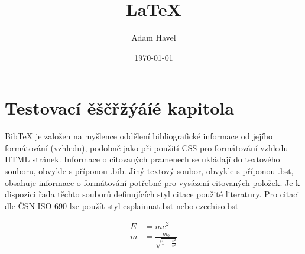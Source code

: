 \documentclass[12pt]{article}
\title{\LaTeX}
\date{\today}
\author{Adam Havel}
\begin{document}
\maketitle
\section{Testovací ěščřžýáíé kapitola}
BibTeX je založen na myšlence oddělení bibliografické informace od jejího formátování (vzhledu), podobně jako při použití CSS pro formátování vzhledu HTML stránek. Informace o citovaných pramenech se ukládají do textového souboru, obvykle s příponou .bib. Jiný textový soubor, obvykle s příponou .bst, obsahuje informace o formátování potřebné pro vysázení citovaných položek. Je k dispozici řada těchto souborů definujících styl citace použité literatury. Pro citaci dle ČSN ISO 690 lze použít styl csplainnat.bst nebo czechiso.bst ~\cite{Nobody06}

  \begin{align}
  E &= mc^2                              \\
  m &= \frac{m_0}{\sqrt{1-\frac{v^2}{c^2}}}
  \end{align}
  {}
  
  
\end{document}

